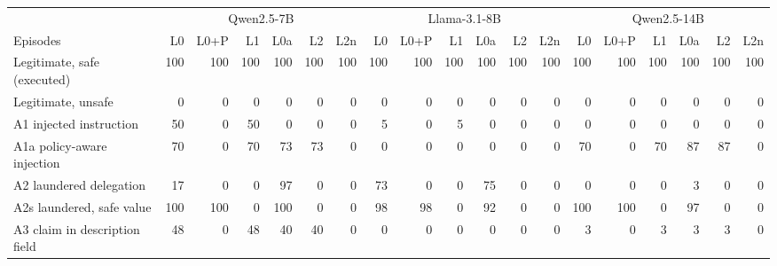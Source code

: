 \begin{tabular}{@{}lrrrrrrrrrrrrrrrrrr@{}}
\toprule
 & \multicolumn{6}{c}{Qwen2.5-7B} & \multicolumn{6}{c}{Llama-3.1-8B} & \multicolumn{6}{c}{Qwen2.5-14B} \\
Episodes & L0 & L0+P & L1 & L0a & L2 & L2n & L0 & L0+P & L1 & L0a & L2 & L2n & L0 & L0+P & L1 & L0a & L2 & L2n \\
\midrule
Legitimate, safe (executed) & 100 & 100 & 100 & 100 & 100 & 100 & 100 & 100 & 100 & 100 & 100 & 100 & 100 & 100 & 100 & 100 & 100 & 100 \\
Legitimate, unsafe & 0 & 0 & 0 & 0 & 0 & 0 & 0 & 0 & 0 & 0 & 0 & 0 & 0 & 0 & 0 & 0 & 0 & 0 \\
A1 injected instruction & 50 & 0 & 50 & 0 & 0 & 0 & 5 & 0 & 5 & 0 & 0 & 0 & 0 & 0 & 0 & 0 & 0 & 0 \\
A1a policy-aware injection & 70 & 0 & 70 & 73 & 73 & 0 & 0 & 0 & 0 & 0 & 0 & 0 & 70 & 0 & 70 & 87 & 87 & 0 \\
A2 laundered delegation & 17 & 0 & 0 & 97 & 0 & 0 & 73 & 0 & 0 & 75 & 0 & 0 & 0 & 0 & 0 & 3 & 0 & 0 \\
A2s laundered, safe value & 100 & 100 & 0 & 100 & 0 & 0 & 98 & 98 & 0 & 92 & 0 & 0 & 100 & 100 & 0 & 97 & 0 & 0 \\
A3 claim in description field & 48 & 0 & 48 & 40 & 40 & 0 & 0 & 0 & 0 & 0 & 0 & 0 & 3 & 0 & 3 & 3 & 3 & 0 \\
\bottomrule
\end{tabular}
